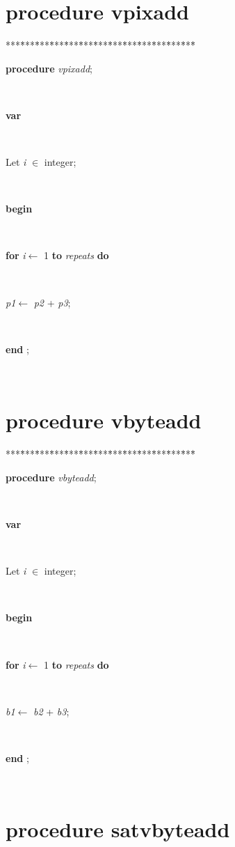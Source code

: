 \documentclass[10pt, a4paper]{article}
\begin{document}
\section{procedure vpixadd}\label{sec:vectest/dovectestvpixadd}

\begin{tabbing}
***\=***\=***\=***\=***\=***\=***\=***\=***\=***\=***\=***\=***\=\kill
\parbox{14cm}{\textsf {\textbf {procedure } \textsf{\textit{vpixadd}}; }}\\
\+\parbox{14cm}{\textsf{\textbf{var} }}\\
\parbox{14cm}{\textsf{Let \textit{i} $\in$ integer;}}\\
\-\<\+\parbox{14cm}{\textsf{\textbf{begin} }}\\
\+\parbox{14cm}{\textsf {\textbf {for } \textsf{\textit{i}$\leftarrow$ 1} \textbf{ to } \textsf{\textit{repeats}} \textbf{ do } }}\\
\-\parbox{14cm}{\textsf{\textit{p1}$\leftarrow$ \textit{p2} + \textit{p3}}; }\\
\<\-\parbox{14cm}{\textsf{\textbf{end} ;}}\\
\end{tabbing}
\section{procedure vbyteadd}\label{sec:vectest/dovectestvbyteadd}

\begin{tabbing}
***\=***\=***\=***\=***\=***\=***\=***\=***\=***\=***\=***\=***\=\kill
\parbox{14cm}{\textsf {\textbf {procedure } \textsf{\textit{vbyteadd}}; }}\\
\+\parbox{14cm}{\textsf{\textbf{var} }}\\
\parbox{14cm}{\textsf{Let \textit{i} $\in$ integer;}}\\
\-\<\+\parbox{14cm}{\textsf{\textbf{begin} }}\\
\+\parbox{14cm}{\textsf {\textbf {for } \textsf{\textit{i}$\leftarrow$ 1} \textbf{ to } \textsf{\textit{repeats}} \textbf{ do } }}\\
\-\parbox{14cm}{\textsf{\textit{b1}$\leftarrow$ \textit{b2} + \textit{b3}}; }\\
\<\-\parbox{14cm}{\textsf{\textbf{end} ;}}\\
\end{tabbing}
\section{procedure satvbyteadd}\label{sec:vectest/dovectestsatvbyteadd}
\end{document}
